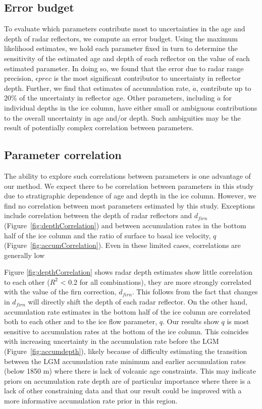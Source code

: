 \subsection{Error budget}
To evaluate which parameters contribute most to uncertainties in the age and depth of radar reflectors, we compute an error budget. Using the maximum likelihood estimates, we hold each parameter fixed in turn to determine the sensitivity of the estimated age and depth of each reflector on the value of each estimated parameter. In doing so, we found that the error due to radar range precision, $\epsilon{prec}$ is the most significant contributor to uncertainty in reflector depth. Further, we find that estimates of accumulation rate, $\dot{a}$, contribute up to 20\% of the uncertainty in reflector age. Other parameters, including $\dot{a}$ for individual depths in the ice column, have either small or ambiguous contributions to the overall uncertainty in age and/or depth. Such ambiguities may be the result of potentially complex correlation between parameters. 


\subsection{Parameter correlation}\label{sec:ke}
The ability to explore such correlations between parameters is one advantage of our method. We expect there to be correlation between parameters in this study due to stratigraphic dependence of age and depth in the ice column. However, we find no correlation between most parameters estimated by this study. Exceptions include correlation between the depth of radar reflectors and $d_{firn}$ (Figure~\ref{fig:depthCorrelation}) and between accumulation rates in the bottom half of the ice column and the ratio of surface to basal ice velocity, $q$ (Figure~\ref{fig:accumCorrelation}). Even in these limited cases, correlations are generally low



Figure \ref{fig:depthCorrelation} shows radar depth estimates show little correlation to each other ($R^2$ < 0.2 for all combinations), they are more strongly correlated with the value of the firn correction, $d_{firn}$. This follows from the fact that changes in $d_{firn}$ will directly shift the depth of each radar reflector. On the other hand, accumulation rate estimates in the bottom half of the ice column are correlated both to each other and to the ice flow parameter, $q$. Our results show $q$ is most sensitive to accumulation rates at the bottom of the ice column. This coincides with increasing uncertainty in the accumulation rate before the LGM (Figure~\ref{fig:accumdepth}), likely because of difficulty estimating the transition between the LGM accumulation rate minimum and earlier accumulation rates (below 1850 m) where there is lack of volcanic age constraints. This may indicate priors on accumulation rate depth are of particular importance where there is a lack of other constraining data and that our result could be improved with a more informative accumulation rate prior in this region.

